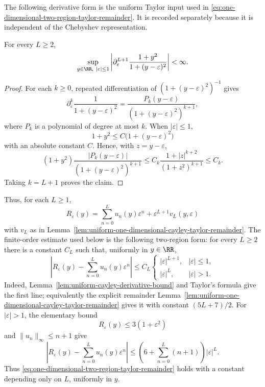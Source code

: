 The following derivative form is the uniform Taylor input used in
\eqref{eq:one-dimensional-two-region-taylor-remainder}.  It is recorded
separately because it is independent of the Chebyshev representation.

\begin{lemma}%
\label{lem:uniform-cayley-derivative-bound}
For every \(L\ge2\),
\[
\sup_{y\in\RR,\ |\varepsilon|\le1}
\left|
\partial_\varepsilon^{L+1}
\frac{1+y^2}{1+(y-\varepsilon)^2}
\right|<\infty .
\]
\end{lemma}

\ifdefined\JFAArticleMain
{}
\else
\begin{proof}
For each \(k\ge0\), repeated differentiation of
\((1+(y-\varepsilon)^2)^{-1}\) gives
\[
\partial_\varepsilon^k
\frac{1}{1+(y-\varepsilon)^2}
=
\frac{P_k(y-\varepsilon)}
{(1+(y-\varepsilon)^2)^{k+1}},
\]
where \(P_k\) is a polynomial of degree at most \(k\).  When
\(|\varepsilon|\le1\),
\[
1+y^2\le C\bigl(1+(y-\varepsilon)^2\bigr)
\]
with an absolute constant \(C\).  Hence, with \(z=y-\varepsilon\),
\[
(1+y^2)
\frac{|P_k(y-\varepsilon)|}{(1+(y-\varepsilon)^2)^{k+1}}
\le
C_k\frac{1+|z|^{k+2}}{(1+z^2)^{k+1}}
\le C_k .
\]
Taking \(k=L+1\) proves the claim.
\end{proof}
\fi

Thus, for each \(L\ge1\),
\[
R_\varepsilon(y)=\sum_{n=0}^{L}u_n(y)\varepsilon^n
 +\varepsilon^{L+1}v_L(y,\varepsilon)
\]
with \(v_L\) as in
Lemma~\ref{lem:uniform-one-dimensional-cayley-taylor-remainder}.  The
finite-order estimate used below is the
following two-region form: for every \(L\ge2\) there is a constant \(C_L\)
such that, uniformly in \(y\in\RR\),
\begin{equation}\label{eq:one-dimensional-two-region-taylor-remainder}
\left|R_\varepsilon(y)-\sum_{n=0}^{L}u_n(y)\varepsilon^n\right|
\le C_L
\begin{cases}
|\varepsilon|^{L+1},& |\varepsilon|\le1,\\
|\varepsilon|^L,& |\varepsilon|>1.
\end{cases}
\end{equation}
Indeed, Lemma~\ref{lem:uniform-cayley-derivative-bound} and Taylor's formula
give the first line; equivalently the explicit remainder
Lemma~\ref{lem:uniform-one-dimensional-cayley-taylor-remainder}
gives it with constant \((5L+7)/2\).  For
\(|\varepsilon|>1\), the elementary bound
\[
R_\varepsilon(y)\le3(1+\varepsilon^2)
\]
and \(\|u_n\|_\infty\le n+1\) give
\[
\left|R_\varepsilon(y)-\sum_{n=0}^{L}u_n(y)\varepsilon^n\right|
\le
\left(6+\sum_{n=0}^{L}(n+1)\right)|\varepsilon|^L .
\]
Thus \eqref{eq:one-dimensional-two-region-taylor-remainder} holds with a
constant depending only on \(L\), uniformly in \(y\).

